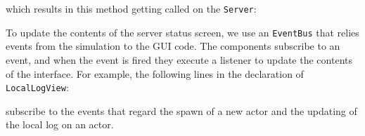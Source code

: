 which results in this method getting called on the \texttt{Server}:


To update the contents of the server status screen, we use an \texttt{EventBus} that relies events from the simulation to the GUI code. The components subscribe to an event, and when the event is fired they execute a listener to update the contents of the interface. For example, the following lines in the declaration of \texttt{LocalLogView}:

subscribe to the events that regard the spawn of a new actor and the updating of the local log on an actor.

\clearpage
\newpage
